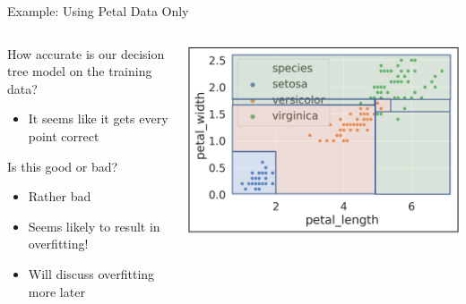 \documentclass[aspectratio=169]{../latex_main/tntbeamer}  %
\begin{document}
	 
	 \begin{frame}{Example: Using Petal Data Only}
	   \begin{columns}
	        \begin{column}{.5\textwidth}
	        
	               How accurate is our decision tree model on the training data?\\
	               \begin{itemize}
	                   \item It seems like it gets every point correct
	               \end{itemize}
	               \bigskip
	                Is this good or bad?
	                \begin{itemize}
	                    \item Rather bad
	                    \item Seems likely to result in overfitting!
	                    \item Will discuss overfitting more later
	                \end{itemize}
	                
	        \end{column}
	   
	   
	         \begin{column}{.5\textwidth}

	                     \includegraphics[scale=.34]{Bild16}
	                     
	        \end{column}
	   \end{columns}
	 \end{frame}
\end{document}
